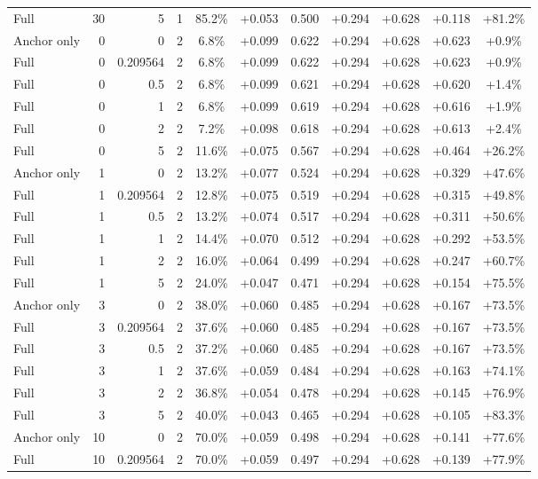 \begin{table}[htbp]
\begin{tabular}{lrrrccccccc}
Full & 30 & 5 & 1 & 85.2\% & +0.053 & 0.500 & +0.294 & +0.628 & +0.118 & +81.2\% \\
Anchor only & 0 & 0 & 2 & 6.8\% & +0.099 & 0.622 & +0.294 & +0.628 & +0.623 & +0.9\% \\
Full & 0 & 0.209564 & 2 & 6.8\% & +0.099 & 0.622 & +0.294 & +0.628 & +0.623 & +0.9\% \\
Full & 0 & 0.5 & 2 & 6.8\% & +0.099 & 0.621 & +0.294 & +0.628 & +0.620 & +1.4\% \\
Full & 0 & 1 & 2 & 6.8\% & +0.099 & 0.619 & +0.294 & +0.628 & +0.616 & +1.9\% \\
Full & 0 & 2 & 2 & 7.2\% & +0.098 & 0.618 & +0.294 & +0.628 & +0.613 & +2.4\% \\
Full & 0 & 5 & 2 & 11.6\% & +0.075 & 0.567 & +0.294 & +0.628 & +0.464 & +26.2\% \\
Anchor only & 1 & 0 & 2 & 13.2\% & +0.077 & 0.524 & +0.294 & +0.628 & +0.329 & +47.6\% \\
Full & 1 & 0.209564 & 2 & 12.8\% & +0.075 & 0.519 & +0.294 & +0.628 & +0.315 & +49.8\% \\
Full & 1 & 0.5 & 2 & 13.2\% & +0.074 & 0.517 & +0.294 & +0.628 & +0.311 & +50.6\% \\
Full & 1 & 1 & 2 & 14.4\% & +0.070 & 0.512 & +0.294 & +0.628 & +0.292 & +53.5\% \\
Full & 1 & 2 & 2 & 16.0\% & +0.064 & 0.499 & +0.294 & +0.628 & +0.247 & +60.7\% \\
Full & 1 & 5 & 2 & 24.0\% & +0.047 & 0.471 & +0.294 & +0.628 & +0.154 & +75.5\% \\
Anchor only & 3 & 0 & 2 & 38.0\% & +0.060 & 0.485 & +0.294 & +0.628 & +0.167 & +73.5\% \\
Full & 3 & 0.209564 & 2 & 37.6\% & +0.060 & 0.485 & +0.294 & +0.628 & +0.167 & +73.5\% \\
Full & 3 & 0.5 & 2 & 37.2\% & +0.060 & 0.485 & +0.294 & +0.628 & +0.167 & +73.5\% \\
Full & 3 & 1 & 2 & 37.6\% & +0.059 & 0.484 & +0.294 & +0.628 & +0.163 & +74.1\% \\
Full & 3 & 2 & 2 & 36.8\% & +0.054 & 0.478 & +0.294 & +0.628 & +0.145 & +76.9\% \\
Full & 3 & 5 & 2 & 40.0\% & +0.043 & 0.465 & +0.294 & +0.628 & +0.105 & +83.3\% \\
Anchor only & 10 & 0 & 2 & 70.0\% & +0.059 & 0.498 & +0.294 & +0.628 & +0.141 & +77.6\% \\
Full & 10 & 0.209564 & 2 & 70.0\% & +0.059 & 0.497 & +0.294 & +0.628 & +0.139 & +77.9\% \\

\end{tabular}
\end{table}
